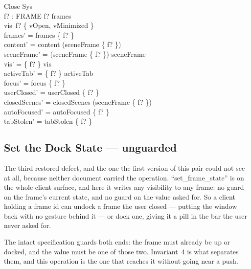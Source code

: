 \documentclass[a4paper,10pt,fleqn]{article}
\begin{document}
\begin{schema}{Close}
  \Delta Sys \\
  f? : FRAME
\where
  f? \in frames \\
  vis~f? \in \{ vOpen, vMinimized \} \\
  frames' = frames \setminus \{ f? \} \\
  content' = content \setminus \dom (sceneFrame \rres \{ f? \}) \\
  sceneFrame' = \dom (sceneFrame \rres \{ f? \}) \ndres sceneFrame \\
  vis' = \{ f? \} \ndres vis \\
  activeTab' = \{ f? \} \ndres activeTab \\
  focus' = focus \setminus \{ f? \} \\
  userClosed' = userClosed \cup \{ f? \} \\
  closedScenes' = closedScenes \cup \dom (sceneFrame \rres \{ f? \}) \\
  autoFocused' = autoFocused \setminus \{ f? \} \\
  tabStolen' = tabStolen \setminus \{ f? \}
\end{schema}

\subsection{Set the Dock State --- unguarded}

The third restored defect, and the one the first version of this pair could not
see at all, because neither document carried the operation.  ``set\_frame\_state''
is on the whole client surface, and here it writes any visibility to any frame:
no guard on the frame's current state, and no guard on the value asked for.  So
a client holding a frame id can undock a frame the user closed --- putting the
window back with no gesture behind it --- or dock one, giving it a pill in the
bar the user never asked for.

The intact specification guards both ends: the frame must already be up or
docked, and the value must be one of those two.  Invariant~4 is what separates
them, and this operation is the one that reaches it without going near a push.
\end{document}
